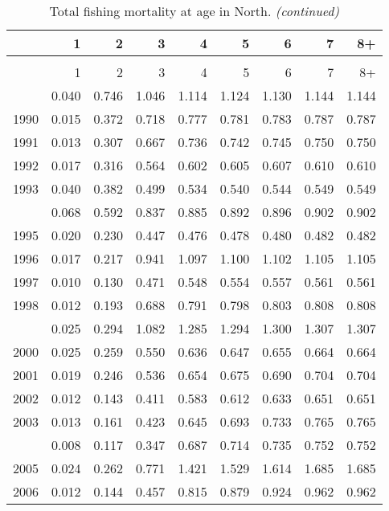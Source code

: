 \documentclass[
]{article}
\begin{document}
\begin{longtable}[t]{lrrrrrrrr}
\caption{\label{tab:North-region-FAA-table}Total fishing mortality at age in North.}\\
\toprule
  & 1 & 2 & 3 & 4 & 5 & 6 & 7 & 8+\\
\midrule
\endfirsthead
\caption[]{Total fishing mortality at age in North. \textit{(continued)}}\\
\toprule
  & 1 & 2 & 3 & 4 & 5 & 6 & 7 & 8+\\
\midrule
\endhead

\endfoot
\bottomrule
\endlastfoot
1989 & 0.040 & 0.746 & 1.046 & 1.114 & 1.124 & 1.130 & 1.144 & 1.144\\
1990 & 0.015 & 0.372 & 0.718 & 0.777 & 0.781 & 0.783 & 0.787 & 0.787\\
1991 & 0.013 & 0.307 & 0.667 & 0.736 & 0.742 & 0.745 & 0.750 & 0.750\\
1992 & 0.017 & 0.316 & 0.564 & 0.602 & 0.605 & 0.607 & 0.610 & 0.610\\
1993 & 0.040 & 0.382 & 0.499 & 0.534 & 0.540 & 0.544 & 0.549 & 0.549\\
\addlinespace
1994 & 0.068 & 0.592 & 0.837 & 0.885 & 0.892 & 0.896 & 0.902 & 0.902\\
1995 & 0.020 & 0.230 & 0.447 & 0.476 & 0.478 & 0.480 & 0.482 & 0.482\\
1996 & 0.017 & 0.217 & 0.941 & 1.097 & 1.100 & 1.102 & 1.105 & 1.105\\
1997 & 0.010 & 0.130 & 0.471 & 0.548 & 0.554 & 0.557 & 0.561 & 0.561\\
1998 & 0.012 & 0.193 & 0.688 & 0.791 & 0.798 & 0.803 & 0.808 & 0.808\\
\addlinespace
1999 & 0.025 & 0.294 & 1.082 & 1.285 & 1.294 & 1.300 & 1.307 & 1.307\\
2000 & 0.025 & 0.259 & 0.550 & 0.636 & 0.647 & 0.655 & 0.664 & 0.664\\
2001 & 0.019 & 0.246 & 0.536 & 0.654 & 0.675 & 0.690 & 0.704 & 0.704\\
2002 & 0.012 & 0.143 & 0.411 & 0.583 & 0.612 & 0.633 & 0.651 & 0.651\\
2003 & 0.013 & 0.161 & 0.423 & 0.645 & 0.693 & 0.733 & 0.765 & 0.765\\
\addlinespace
2004 & 0.008 & 0.117 & 0.347 & 0.687 & 0.714 & 0.735 & 0.752 & 0.752\\
2005 & 0.024 & 0.262 & 0.771 & 1.421 & 1.529 & 1.614 & 1.685 & 1.685\\
2006 & 0.012 & 0.144 & 0.457 & 0.815 & 0.879 & 0.924 & 0.962 & 0.962\\

\end{longtable}
\end{document}

